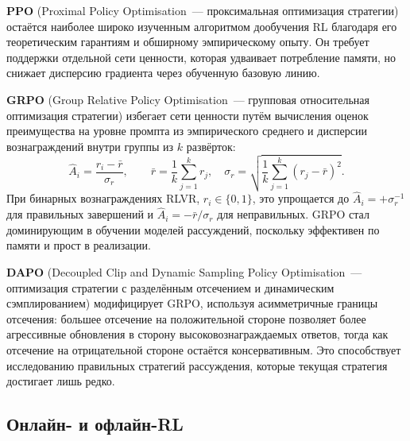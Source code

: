 \textbf{PPO} (Proximal Policy Optimisation~--- проксимальная оптимизация стратегии)
остаётся наиболее широко изученным алгоритмом дообучения RL благодаря
его теоретическим гарантиям и обширному эмпирическому опыту.
Он требует поддержки отдельной сети ценности, которая удваивает
потребление памяти, но снижает дисперсию градиента через обученную базовую линию.

\textbf{GRPO} (Group Relative Policy Optimisation~--- групповая относительная оптимизация стратегии) избегает
сети ценности путём вычисления оценок преимущества на уровне промпта из
эмпирического среднего и дисперсии вознаграждений внутри группы из $k$
развёрток:
\begin{equation}
\label{eq:grpo-advantage-ch15}
\hat{A}_i = \frac{r_i - \bar{r}}{\sigma_r}, \qquad
\bar{r} = \frac{1}{k}\sum_{j=1}^k r_j, \quad
\sigma_r = \sqrt{\frac{1}{k}\sum_{j=1}^k (r_j - \bar{r})^2}.
\end{equation}
При бинарных вознаграждениях RLVR, $r_i \in \{0, 1\}$, это упрощается до
$\hat{A}_i = +\sigma_r^{-1}$ для правильных завершений и
$\hat{A}_i = -\bar{r}/\sigma_r$ для неправильных. GRPO стал
доминирующим в обучении моделей рассуждений, поскольку эффективен по памяти
и прост в реализации.

\textbf{DAPO} (Decoupled Clip and Dynamic Sampling Policy
Optimisation~--- оптимизация стратегии с разделённым отсечением и динамическим сэмплированием) модифицирует GRPO, используя асимметричные границы отсечения: большее
отсечение на положительной стороне позволяет более агрессивные обновления в сторону
высоковознаграждаемых ответов, тогда как отсечение на отрицательной стороне остаётся консервативным.
Это способствует исследованию правильных стратегий рассуждения, которые
текущая стратегия достигает лишь редко.

\subsection{Онлайн- и офлайн-RL}
\label{subsec:online-offline}

